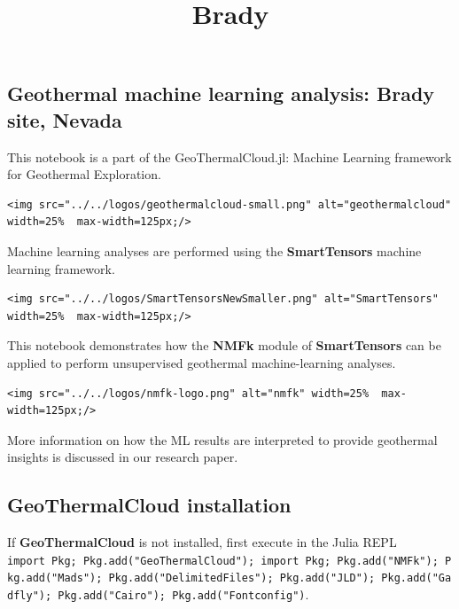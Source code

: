 \documentclass[11pt]{article}
\title{Brady}
\begin{document}
    
    \maketitle
    
    

    
    \hypertarget{geothermal-machine-learning-analysis-brady-site-nevada}{%
\subsection{Geothermal machine learning analysis: Brady site,
Nevada}\label{geothermal-machine-learning-analysis-brady-site-nevada}}

This notebook is a part of the GeoThermalCloud.jl: Machine Learning
framework for Geothermal Exploration.

\begin{verbatim}
<img src="../../logos/geothermalcloud-small.png" alt="geothermalcloud" width=25%  max-width=125px;/>
\end{verbatim}

Machine learning analyses are performed using the \textbf{SmartTensors}
machine learning framework.

\begin{verbatim}
<img src="../../logos/SmartTensorsNewSmaller.png" alt="SmartTensors" width=25%  max-width=125px;/>
\end{verbatim}

This notebook demonstrates how the \textbf{NMFk} module of
\textbf{SmartTensors} can be applied to perform unsupervised geothermal
machine-learning analyses.

\begin{verbatim}
<img src="../../logos/nmfk-logo.png" alt="nmfk" width=25%  max-width=125px;/>
\end{verbatim}

More information on how the ML results are interpreted to provide
geothermal insights is discussed in our research paper.

    \hypertarget{geothermalcloud-installation}{%
\subsection{GeoThermalCloud
installation}\label{geothermalcloud-installation}}

If \textbf{GeoThermalCloud} is not installed, first execute in the Julia
REPL
\texttt{import\ Pkg;\ Pkg.add("GeoThermalCloud");\ import\ Pkg;\ Pkg.add("NMFk");\ Pkg.add("Mads");\ Pkg.add("DelimitedFiles");\ Pkg.add("JLD");\ Pkg.add("Gadfly");\ Pkg.add("Cairo");\ Pkg.add("Fontconfig")}.
\end{document}
